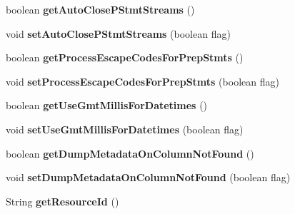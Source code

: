 \begin{DoxyCompactItemize}
boolean {\bfseries get\+Auto\+Close\+P\+Stmt\+Streams} ()
\item 
\mbox{\label{interfacecom_1_1mysql_1_1jdbc_1_1_connection_properties_afb92b0e94f26d6578ee2b975c11cdd16}} 
void {\bfseries set\+Auto\+Close\+P\+Stmt\+Streams} (boolean flag)
\item 
\mbox{\label{interfacecom_1_1mysql_1_1jdbc_1_1_connection_properties_ab900093343ab642b7ed27e0d90c37b4c}} 
boolean {\bfseries get\+Process\+Escape\+Codes\+For\+Prep\+Stmts} ()
\item 
\mbox{\label{interfacecom_1_1mysql_1_1jdbc_1_1_connection_properties_adc166408cb4dd9b5c6eaa0118f339229}} 
void {\bfseries set\+Process\+Escape\+Codes\+For\+Prep\+Stmts} (boolean flag)
\item 
\mbox{\label{interfacecom_1_1mysql_1_1jdbc_1_1_connection_properties_a8d97bcb5b5bbb5e6d6a7af37db001af9}} 
boolean {\bfseries get\+Use\+Gmt\+Millis\+For\+Datetimes} ()
\item 
\mbox{\label{interfacecom_1_1mysql_1_1jdbc_1_1_connection_properties_a4768570e84f3d3234d1a3507aa48a20e}} 
void {\bfseries set\+Use\+Gmt\+Millis\+For\+Datetimes} (boolean flag)
\item 
\mbox{\label{interfacecom_1_1mysql_1_1jdbc_1_1_connection_properties_a8b9c789b760be50660c747561f9f8170}} 
boolean {\bfseries get\+Dump\+Metadata\+On\+Column\+Not\+Found} ()
\item 
\mbox{\label{interfacecom_1_1mysql_1_1jdbc_1_1_connection_properties_a226eb1ac0630e56f5dba3d7b01aa0b04}} 
void {\bfseries set\+Dump\+Metadata\+On\+Column\+Not\+Found} (boolean flag)
\item 
\mbox{\label{interfacecom_1_1mysql_1_1jdbc_1_1_connection_properties_a5643b726c8ff37f1a2668546c829f609}} 
String {\bfseries get\+Resource\+Id} ()

\end{DoxyCompactItemize}
